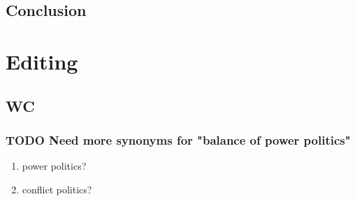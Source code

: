 \documentclass[11pt]{article}
\begin{document}
\subsection{Conclusion}
\label{sec:org4730c48}



\section{Editing}
\label{sec:org1f828a6}
\subsection{WC}
\label{sec:org24c356f}
\subsubsection{{\bfseries\sffamily TODO} Need more synonyms for "balance of power politics"}
\label{sec:orge23bc32}
\begin{enumerate}
\item power politics?
\label{sec:orgb736abc}
\item conflict politics?
\label{sec:org700bf65}
\end{enumerate}
\end{document}
